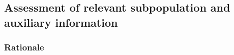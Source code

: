 \documentclass[a4paper,12pt,%
onecolumn,oneside,article,%
british%
]{memoir}
\theoremstyle{remark}
\theoremstyle{innote}
\renewcommand*{\|}[1][]{\nonscript\:#1\vert\nonscript\:\mathopen{}}
\begin{document}








\bigskip%
\subsection{Assessment of relevant subpopulation and auxiliary information}
\label{sec:population_step}

\subsubsection{Rationale}
\label{sec:population_step_rationale}
\end{document}
